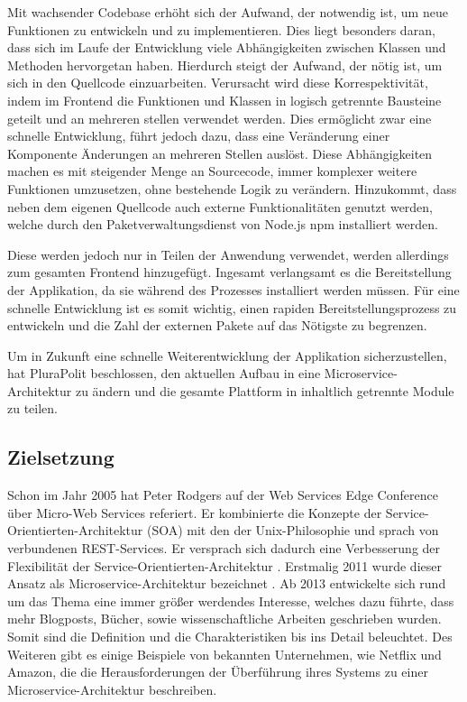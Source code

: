 Mit wachsender Codebase erhöht sich der Aufwand, der notwendig ist, um neue Funktionen zu entwickeln und zu implementieren. Dies liegt besonders daran, dass sich im Laufe der Entwicklung viele Abhängigkeiten zwischen Klassen und Methoden hervorgetan haben. Hierdurch steigt der Aufwand, der nötig ist, um sich in den Quellcode einzuarbeiten. Verursacht wird diese Korrespektivität, indem im Frontend die Funktionen und Klassen in logisch getrennte Bausteine geteilt und an mehreren stellen verwendet werden. Dies ermöglicht zwar eine schnelle Entwicklung, führt jedoch dazu, dass eine Veränderung einer Komponente Änderungen an mehreren Stellen auslöst. Diese Abhängigkeiten machen es mit steigender Menge an Sourcecode, immer komplexer weitere Funktionen umzusetzen, ohne bestehende Logik zu verändern. Hinzukommt, dass neben dem eigenen Quellcode auch externe Funktionalitäten genutzt werden, welche durch den Paketverwaltungsdienst von Node.js \parencite{nodejs} npm installiert werden.

Diese werden jedoch nur in Teilen der Anwendung verwendet, werden allerdings zum gesamten Frontend hinzugefügt. Ingesamt verlangsamt es die Bereitstellung der Applikation, da sie während des Prozesses installiert werden müssen. Für eine schnelle Entwicklung ist es somit wichtig, einen rapiden Bereitstellungsprozess zu entwickeln und die Zahl der externen Pakete auf das Nötigste zu begrenzen.

Um in Zukunft eine schnelle Weiterentwicklung der Applikation sicherzustellen, hat PluraPolit beschlossen, den aktuellen Aufbau in eine Microservice-Architektur zu ändern und die gesamte Plattform in inhaltlich getrennte Module zu teilen.

\subsection{Zielsetzung}

Schon im Jahr 2005 hat Peter Rodgers auf der Web Services Edge Conference über Micro-Web Services referiert. Er kombinierte die Konzepte der Service-Orientierten-Architektur (SOA) mit den der Unix-Philosophie und sprach von verbundenen REST-Services. Er versprach sich dadurch eine Verbesserung der Flexibilität der Service-Orientierten-Architektur \parencite[vlg.][]{rodgers_peter}. Erstmalig 2011 wurde dieser Ansatz als Microservice-Architektur bezeichnet \parencite[vlg.][]{dragoni_microservices_2017}. Ab 2013 entwickelte sich rund um das Thema eine immer größer werdendes Interesse, welches dazu führte, dass mehr Blogposts, Bücher, sowie wissenschaftliche Arbeiten geschrieben wurden. Somit sind die Definition und die Charakteristiken bis ins Detail beleuchtet. Des Weiteren gibt es einige Beispiele von bekannten Unternehmen, wie Netflix und Amazon, die die Herausforderungen der Überführung ihres Systems zu einer Microservice-Architektur beschreiben.

